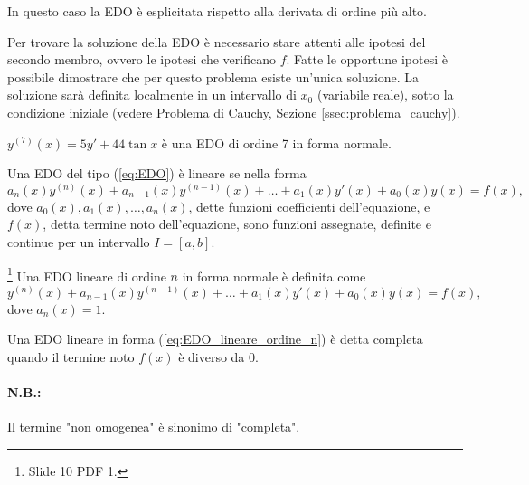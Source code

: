 In questo caso la EDO è esplicitata rispetto alla derivata di ordine più alto.

Per trovare la soluzione della EDO è necessario stare attenti alle ipotesi del secondo membro, ovvero le ipotesi che verificano $f$. Fatte le opportune ipotesi è possibile dimostrare che per questo problema esiste un'unica soluzione. La soluzione sarà definita localmente in un intervallo di $x_0$ (variabile reale), sotto la condizione iniziale (vedere Problema di Cauchy, Sezione \ref{ssec:problema_cauchy}).

\begin{example}
    $y^{(7)}(x)=5y'+44\tan x$ è una EDO di ordine 7 in forma normale.
\end{example}
\begin{definition}
    Una EDO del tipo (\ref{eq:EDO}) è lineare se nella forma
    \begin{equation}\label{eq:EDO_lineare_ordine_n}
        a_n(x)y^{(n)}(x)+a_{n-1}(x)y^{(n-1)}(x)+\hdots+a_1(x)y'(x)+a_0(x)y(x)=f(x),
    \end{equation}
    dove $a_0(x),a_1(x),\hdots, a_n(x)$, dette funzioni coefficienti dell'equazione, e  $f(x)$, detta termine noto dell'equazione, sono funzioni assegnate, definite e continue per un intervallo $I=[a,b]$.
\end{definition}

\begin{definition}\label{def:EDO_lineare_completa_ordine_n_forma_normale}\footnote{Slide 10 PDF 1.}
    Una EDO lineare di ordine $n$ in forma normale è definita come
    \begin{equation}\label{eq:EDO_lineare_ordine_n_forma_normale}
        y^{(n)}(x)+a_{n-1}(x)y^{(n-1)}(x)+\hdots+a_1(x)y'(x)+a_0(x)y(x)=f(x),
    \end{equation}
    dove $a_n(x)=1$.
\end{definition}

\begin{definition}
    Una EDO lineare in forma (\ref{eq:EDO_lineare_ordine_n}) è detta completa quando il termine noto $f(x)$ è diverso da 0.
\end{definition}

\paragraph{N.B.:} Il termine "non omogenea" è sinonimo di "completa".

